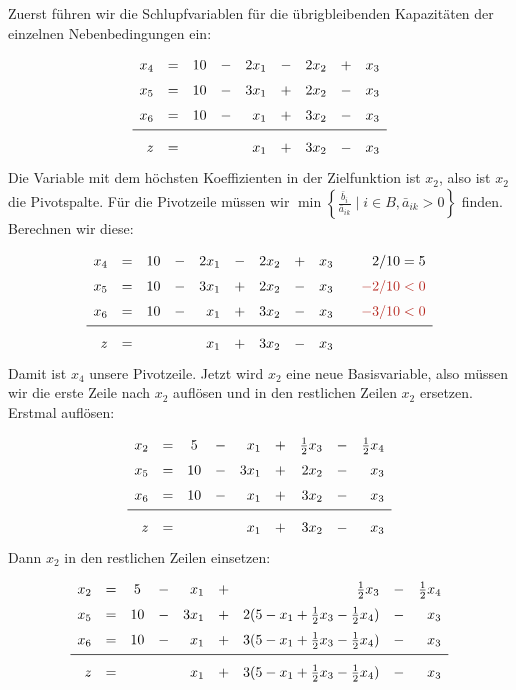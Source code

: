 \documentclass[
a4paper, %
11pt,
]
{scrartcl}
\begin{document}
Zuerst führen wir die Schlupfvariablen für die übrigbleibenden Kapazitäten der
einzelnen Nebenbedingungen ein:
\begin{align*}
  \begin{array}{rcccrcrcr}
    x_4 & = & 10 & - & 2 x_1 & - & 2 x_2 & + & x_3\\
    x_5 & = & 10 & - & 3 x_1 & + & 2 x_2 & - & x_3\\
    x_6 & = & 10 & - & x_1   & + & 3 x_2 & - & x_3\\
    \midrule
    z   & = &    &   & x_1   & + & 3 x_2 & - & x_3
  \end{array}
\end{align*}
Die Variable mit dem höchsten Koeffizienten in der Zielfunktion ist $x_2$, also
ist $x_2$ die Pivotspalte. Für die Pivotzeile müssen wir
$\min \left\{
  \frac{\bar{b}_i}{\bar{a}_{ik}} \mid i \in B, \bar{a}_{ik} > 0
  \right\}$
finden. Berechnen wir diese:
\begin{align*}
  \begin{array}{rcccrcrcrcr}
    x_4 & = & 10 & - & 2 x_1 & - & 2 x_2 & + & x_3 & & 2/10 = 5\\
    x_5 & = & 10 & - & 3 x_1 & + & 2 x_2 & - & x_3 & & \rot{-2/10 < 0}\\
    x_6 & = & 10 & - & x_1   & + & 3 x_2 & - & x_3 & & \rot{-3/10 < 0}\\
    \midrule
    z   & = &    &   & x_1   & + & 3 x_2 & - & x_3
  \end{array}
\end{align*}
Damit ist $x_4$ unsere Pivotzeile. Jetzt wird $x_2$ eine neue Basisvariable,
also müssen wir die erste Zeile nach $x_2$ auflösen und in den restlichen Zeilen
$x_2$ ersetzen. Erstmal auflösen:
\begin{align*}
  \begin{array}{rcccrcrcr}
    x_2 & = & 5  & - & x_1   & + & \frac{1}{2} x_3 & - & \frac{1}{2} x_4\\
    x_5 & = & 10 & - & 3 x_1 & + & 2 x_2           & - & x_3\\
    x_6 & = & 10 & - & x_1   & + & 3 x_2           & - & x_3\\
    \midrule
    z   & = &    &   & x_1   & + & 3 x_2           & - & x_3
  \end{array}
\end{align*}
Dann $x_2$ in den restlichen Zeilen einsetzen:
\begin{align*}
  \def\arraystretch{1.5}
  \begin{array}{rcccrcrcr}
    x_2 & = & 5  & - & x_1   & + & \frac{1}{2} x_3 & - & \frac{1}{2} x_4\\
    x_5 & = & 10 & - & 3 x_1 & + & 2 (5 - x_1 + \frac{1}{2} x_3 - \frac{1}{2} x_4) & - & x_3\\
    x_6 & = & 10 & - & x_1   & + & 3 (5 - x_1 + \frac{1}{2} x_3 - \frac{1}{2} x_4) & - & x_3\\\midrule
    z   & = &    &   & x_1   & + & 3 (5 - x_1 + \frac{1}{2} x_3 - \frac{1}{2} x_4) & - & x_3
  \end{array}
\end{align*}
\end{document}
